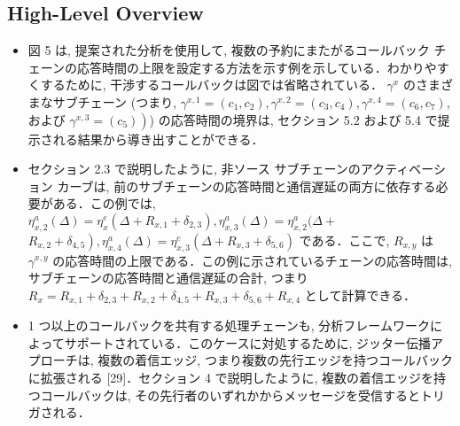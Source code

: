 \subsection{High-Level Overview}
\label{ssec: high-level overview}

\begin{frame}{}
    \begin{itemize}
        \item 図 5 は, 提案された分析を使用して, 複数の予約にまたがるコールバック チェーンの応答時間の上限を設定する方法を示す例を示している．わかりやすくするために, 干渉するコールバックは図では省略されている． $\gamma^{x}$ のさまざまなサブチェーン (つまり, $\gamma^{x, 1}=\left(c_{1}, c_{2}\right), \gamma^{x, 2}=\left(c_{3}, c_{4}\right), \gamma^{x, 4}=\left(c_{6}, c_{7}\right)$, および $\left.\gamma^{x, 3}=\left(c_{5}\right)\right)$) の応答時間の境界は, セクション 5.2 および 5.4 で提示される結果から導き出すことができる．
    \end{itemize}
\end{frame}

\begin{frame}{}
    \begin{itemize}
        \item セクション 2.3 で説明したように, 非ソース サブチェーンのアクティベーション カーブは, 前のサブチェーンの応答時間と通信遅延の両方に依存する必要がある．この例では, $\eta_{x, 2}^{a}(\Delta)=\eta_{x}^{e}\left(\Delta+R_{x, 1}+\delta_{2,3}\right), \eta_{x, 3}^{a}(\Delta)=\eta_{x, 2}^{a}(\Delta+$  $\left.R_{x, 2}+\delta_{4,5}\right), \eta_{x, 4}^{a}(\Delta)=\eta_{x, 3}^{e}\left(\Delta+R_{x, 3}+\delta_{5,6}\right)$ である．ここで, $R_{x, y}$ は $\gamma^{x, y}$ の応答時間の上限である．この例に示されているチェーンの応答時間は, サブチェーンの応答時間と通信遅延の合計, つまり $R_{x}=R_{x, 1}+\delta_{2,3}+R_{x, 2}+\delta_{4,5}+R_{x, 3}+\delta_{5,6}+R_{x, 4}$ として計算できる．
    \end{itemize}
\end{frame}

\begin{frame}{}
    \begin{itemize}
        \item 1 つ以上のコールバックを共有する処理チェーンも, 分析フレームワークによってサポートされている．このケースに対処するために, ジッター伝播アプローチは, 複数の着信エッジ, つまり複数の先行エッジを持つコールバックに拡張される [29]．セクション 4 で説明したように, 複数の着信エッジを持つコールバックは, その先行者のいずれかからメッセージを受信するとトリガされる．
    \end{itemize}
\end{frame}

